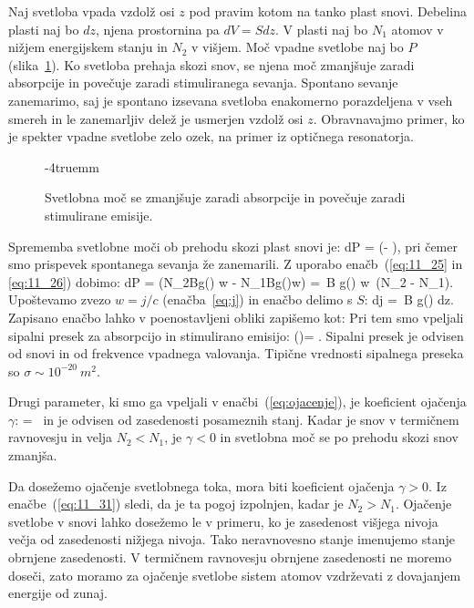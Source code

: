 Naj svetloba vpada vzdolž osi $z$ pod pravim kotom na tanko plast snovi. 
Debelina plasti naj bo $dz$, njena prostornina pa $dV = S dz$. V plasti naj 
bo $N_1$ atomov v nižjem energijskem stanju in $N_2$ v višjem. 
Moč vpadne svetlobe naj bo $P$ (slika~\ref{fig:11_absorpcija}). Ko 
svetloba prehaja skozi snov, se njena moč zmanjšuje zaradi absorpcije 
in povečuje zaradi stimuliranega sevanja. Spontano sevanje 
zanemarimo, saj je spontano izsevana svetloba enakomerno 
porazdeljena v vseh smereh in le zanemarljiv delež je usmerjen 
vzdolž osi $z$. Obravnavajmo primer, ko je spekter vpadne svetlobe
zelo ozek, na primer iz optičnega resonatorja.
\begin{figure}[h!]
\centering
\def\svgwidth{70truemm} 

\caption{Svetlobna moč se zmanjšuje zaradi absorpcije in povečuje
zaradi stimulirane emisije.}
\vglue-4truemm
\label{fig:11_absorpcija}
\end{figure}

Sprememba svetlobne moči ob prehodu skozi plast snovi je:
\beq
dP = \hslash \omega \left(- \right)\!\!,
\label{eq:11_27}
\eeq
pri čemer smo prispevek spontanega sevanja že zanemarili.
Z uporabo enačb~(\ref{eq:11_25} in \ref{eq:11_26}) dobimo:
\beq
dP = 
\hslash \omega \left(N_2Bg(\omega) w - N_1Bg(\omega)w\right) = 
\hslash \omega\,B g(\omega) w\, (N_2 - N_1).
\label{eq:11_28}
\eeq
Upoštevamo zvezo $w = j/c$ (enačba~\ref{eq:j}) in enačbo delimo s $S$:
\beq
dj = \hslash \omega\,B g(\omega) dz.
\label{eq:11_29}
\eeq
Zapisano enačbo lahko v poenostavljeni obliki zapišemo kot:
Pri tem smo vpeljali sipalni presek za absorpcijo in stimulirano emisijo:
\beq
\sigma (\omega)= .
\label{eq:11_30}
\eeq
Sipalni presek je odvisen od snovi in od frekvence vpadnega valovanja. 
Tipične vrednosti sipalnega preseka so $\sigma \sim 10^{-20}~\si{m^2}$.

Drugi parameter, ki smo ga vpeljali v enačbi~(\ref{eq:ojacenje}), 
je koeficient ojačenja $\gamma$:
\beq
\gamma = \sigma \,
\label{eq:11_31}
\eeq
in je odvisen od zasedenosti posameznih stanj. 
Kadar je snov v termičnem ravnovesju in velja $N_2 < N_1$, je $\gamma <0$
in svetlobna moč se po prehodu skozi snov zmanjša. 

Da dosežemo
ojačenje svetlobnega toka, mora biti koeficient ojačenja $\gamma >0$. 
Iz enačbe~(\ref{eq:11_31}) sledi, da je ta pogoj izpolnjen, kadar je $N_2>N_1$.
Ojačenje svetlobe v snovi lahko dosežemo le v primeru, ko je zasedenost
višjega nivoja večja od zasedenosti nižjega nivoja. Tako neravnovesno 
stanje imenujemo stanje obrnjene zasedenosti. V termičnem ravnovesju 
obrnjene zasedenosti ne moremo doseči, zato moramo za ojačenje svetlobe
sistem atomov vzdrževati z dovajanjem energije od zunaj.

